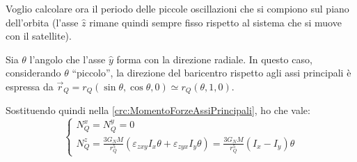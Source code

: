 \documentclass[../main.tex]{subfiles}
\begin{document}
Voglio calcolare ora il periodo delle piccole oscillazioni che si compiono sul piano dell'orbita (l'asse $\hat z$ rimane quindi sempre fisso rispetto al sistema che si muove con il satellite).

Sia $\theta$ l'angolo che l'asse $\hat y$ forma con la direzione radiale. In questo caso, considerando $\theta$ ``piccolo'', la direzione del baricentro rispetto agli assi principali è espressa da $\vec r_Q=r_Q(\sin\theta,\cos\theta,0)\simeq r_Q(\theta,1,0)$.

Sostituendo quindi nella \cref{crc:MomentoForzeAssiPrincipali}, ho che vale:
\begin{equation*}
\begin{cases}
	N_Q^x=N_Q^y=0\\
	N_Q^z=\frac{3G_N M}{r_Q^5} (\varepsilon_{zxy} I_{x}\theta +\varepsilon_{zyx} I_{y}\theta)=\frac{3G_N M}{r_Q^5}(I_x-I_y)\theta
\end{cases}
\end{equation*}
\end{document}
